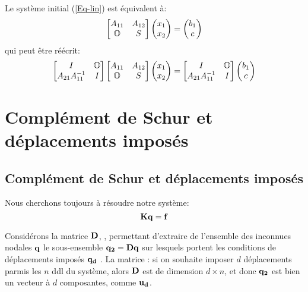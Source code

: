\medskipvm
Le système initial (\ref{Eq-lin}) est équivalent à:
\begin{equation}\label{Eq-Sch1}
\begin{bmatrix} A_{11} & A_{12}\\ \mathbb{O} & S \end{bmatrix}
\begin{pmatrix}x_1\\ x_2 \end{pmatrix} =
\begin{pmatrix} b_1\\ c \end{pmatrix}
\end{equation}
qui peut être réécrit:
\begin{equation}
\begin{bmatrix} I & \mathbb{O}{} \\ A_{21}A_{11}^{-1} & I \end{bmatrix}
\begin{bmatrix} A_{11} & A_{12}\\ \mathbb{O}{} & S \end{bmatrix}
\begin{pmatrix} x_1\\ x_2 \end{pmatrix} =
\begin{bmatrix} I & \mathbb{O}{} \\ A_{21}A_{11}^{-1} & I \end{bmatrix}
\begin{pmatrix} b_1\\ c \end{pmatrix}
\end{equation}

\medskip
\ifVersionAvecExemplesSepares
   \section{Complément de Schur et déplacements imposés}
\else
   \subsection{Complément de Schur et déplacements imposés}
\fi
Nous cherchons toujours à résoudre notre système:
\begin{equation}\mathbf{K}\mathbf{q}=\mathbf{f}\end{equation}

\medskip
Considérons la matrice $\mathbf{D}$, , permettant d'extraire de l'ensemble des inconnues
nodales $\mathbf{q}$ le sous-ensemble $\mathbf{q_2}=\mathbf{D}\mathbf{q}$ sur lesquels portent les conditions de déplacements imposés $\mathbf{q_d}$
.
La matrice : si on souhaite imposer $d$ déplacements parmis les $n$ ddl
du système, alors $\mathbf{D}$ est de dimension $d\times n$, et donc $\mathbf{q_2}$ est bien un vecteur à $d$ composantes,
comme $\mathbf{u_d}$.

